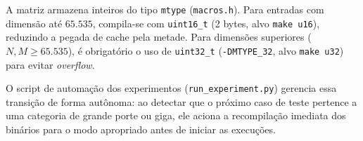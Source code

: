 A matriz armazena inteiros do tipo \texttt{mtype} (\texttt{macros.h}). Para entradas com dimensão até $65.535$, compila-se com \texttt{uint16\_t} (2 bytes, alvo \texttt{make u16}), reduzindo a pegada de cache pela metade. Para dimensões superiores ($N, M \ge 65.535$), é obrigatório o uso de \texttt{uint32\_t} (\texttt{-DMTYPE\_32}, alvo \texttt{make u32}) para evitar \textit{overflow}. 

O script de automação dos experimentos (\texttt{run\_experiment.py}) gerencia essa transição de forma autônoma: ao detectar que o próximo caso de teste pertence a uma categoria de grande porte ou giga, ele aciona a recompilação imediata dos binários para o modo apropriado antes de iniciar as execuções.
